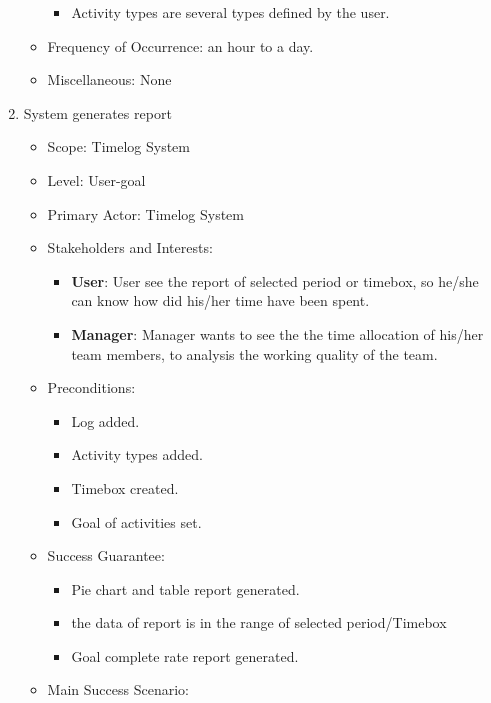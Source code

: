 \documentclass[12pt, a4paper]{article}
\begin{document}
\begin{CJK*}{UTF8}{bkai}
\begin{enumerate}
\begin{itemize}
            \begin{itemize}
              \item Activity types are several types defined by the user.
            \end{itemize}
          \item Frequency of Occurrence: an hour to a day.
          \item Miscellaneous: None
        \end{itemize}
      \item System generates report
        \begin{itemize}
          \item Scope: Timelog System
          \item Level: User-goal
          \item Primary Actor: Timelog System
          \item Stakeholders and Interests:
            \begin{itemize}
              \item {\bf User}: User see the report of selected period or timebox, so he/she can know how did his/her time have been spent.
              \item {\bf Manager}: Manager wants to see the the time allocation of his/her team members, to analysis the working quality of the team.
            \end{itemize}
          \item Preconditions:
            \begin{itemize}
              \item Log added.
              \item Activity types added.
              \item Timebox created.
              \item Goal of activities set.
            \end{itemize}
          \item Success Guarantee:
            \begin{itemize}
              \item Pie chart and table report generated.
              \item the data of report is in the range of selected period/Timebox
              \item Goal complete rate report generated.
            \end{itemize}
          \item Main Success Scenario:
            \begin{enumerate}

\end{enumerate}
\end{itemize}
\end{enumerate}
\end{CJK*}
\end{document}
